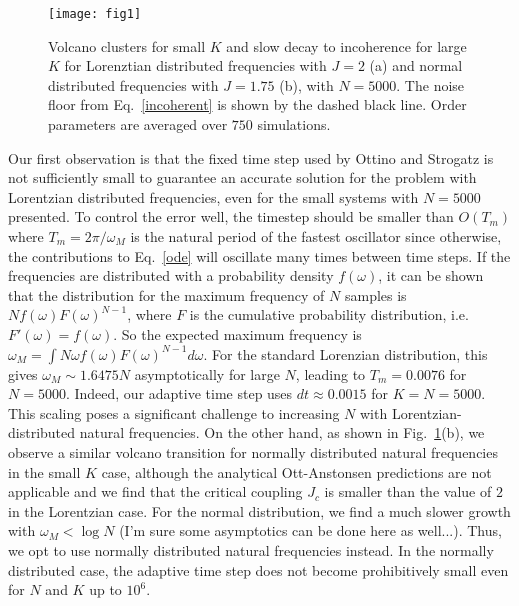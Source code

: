 \documentclass[aps,pre,amsmath,amssymb,floatfix,onecolumn,notitlepage,10pt]{revtex4-1}
\begin{document}
\begin{figure}[hbt]
\texttt{[image: fig1]}
\caption{Volcano clusters for small $K$ and slow decay to incoherence for large $K$ for Lorenztian distributed frequencies with $J=2$ (a) and normal distributed frequencies with $J=1.75$ (b), with $N=5000$.  The noise floor from Eq.~\eqref{incoherent} is shown by the dashed black line.  Order parameters are averaged over $750$ simulations. \label{fig1}}
\end{figure}


Our first observation is that the fixed time step used by Ottino and Strogatz is not sufficiently small to guarantee an accurate solution for the problem with Lorentzian distributed frequencies, even for the small systems with $N=5000$ presented.  To control the error well, the timestep should be smaller than $O(T_m)$ where $T_m=2\pi/\omega_M$ is the natural period of the fastest oscillator since otherwise, the contributions to Eq.~\eqref{ode} will oscillate many times between time steps.  If the frequencies are distributed with a probability density $f(\omega)$, it can be shown that the distribution for the maximum frequency of $N$ samples is $Nf(\omega)F(\omega)^{N-1}$, where $F$ is the cumulative probability distribution, i.e. $F'(\omega)=f(\omega)$. So the expected maximum frequency is $\omega_M = \int N\omega f(\omega)F(\omega)^{N-1} d\omega$. For the standard Lorenzian distribution, this gives $\omega_M \sim 1.6475 N$ asymptotically for large $N$, leading to $T_m=0.0076$ for $N=5000$.  Indeed, our adaptive time step uses $dt\approx0.0015$ for $K=N=5000$. This scaling poses a significant challenge to increasing $N$ with Lorentzian-distributed natural frequencies. On the other hand, as shown in Fig.~\ref{fig1}(b), we observe a similar volcano transition for normally distributed natural frequencies in the small $K$ case, although the analytical Ott-Anstonsen predictions are not applicable and we find that the critical coupling $J_c$ is smaller than the value of $2$ in the Lorentzian case.   For the normal distribution, we find a much slower growth with $\omega_M < \log N$ (I'm sure some asymptotics can be done here as well...).   Thus, we opt to use normally distributed natural frequencies instead. In the normally distributed case, the adaptive time step does not become prohibitively small even for $N$ and $K$ up to $10^6$.
\end{document}
